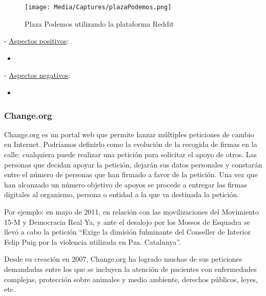 \begin{figure}[H]
\centering
\texttt{[image: Media/Captures/plazaPodemos.png]}
\caption{Plaza Podemos utilizando la plataforma Reddit}
\label{fig:plazaPodemos}
\end{figure}

 - \underline{Aspectos positivos}:

\begin{itemize}
	\item 
\end{itemize}

 - \underline{Aspectos negativos}:

\begin{itemize}
	\item 
\end{itemize}

\subsubsection{Change.org}

Change.org \cite{ref:changeOrg} es un portal web que permite lanzar múltiples peticiones de cambio en Internet. Podríamos definirlo como la evolución de la recogida de firmas en la calle: cualquiera puede realizar una petición para solicitar el apoyo de otros. Las personas que decidan apoyar la petición, dejarán sus datos personales y constarán entre el número de personas que han firmado a favor de la petición. Una vez que han alcanzado un número objetivo de apoyos se procede a entregar las firmas digitales al organismo, persona o entidad a la que va destinada la petición.

Por ejemplo: en mayo de 2011, en relación con las movilizaciones del Movimiento 15-M y Democracia Real Ya, y ante el desalojo por los Mossos de Esquadra se llevó a cabo la petición “Exige la dimisión fulminante del Conseller de Interior Felip Puig por la violencia utilizada en Pza. Catalunya”.

Desde su creación en 2007, Change.org ha logrado muchas de sus peticiones demandadas entre los que se incluyen la atención de pacientes con enfermedades complejas, protección sobre animales y medio ambiente, derechos públicos, leyes, etc.

